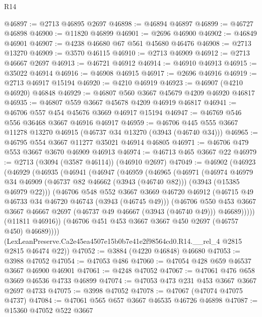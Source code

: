\begin{lexlean}{R14}
\begin{coremodule}
@46897 := @2713 @46895 @2697
@46898 := @46894 @46897
@46899 := @46727 @46898
@46900 := @11820 @46899
@46901 := @2696 @46900
@46902 := @46849 @46901
@46907 := @4238 @46680 @67 @561 @45680 @46476
@46908 := @2713 @13270
@46909 := @3570 @46115
@46910 := @2713 @46909
@46912 := @2713 @46667 @2697
@46913 := @46721 @46912
@46914 := @46910 @46913
@46915 := @35022 @46914
@46916 := @46908 @46915
@46917 := @2696 @46916
@46919 := @2713 @46917 @15194
@46920 := @4210 @46919
@46923 := @46907 (@4210 @46920) @46848
@46929 := @46807 @560 @3667 @45679 @4209 @46920 @46817
@46935 := @46807 @559 @3667 @45678 @4209 @46919 @46817
@46941 := @46706 @557 @454 @45676 @3669 @46917 @15194
@46947 := @46769 @546 @556 @36468 @3667 @46916 @46917
@46959 := @46706 @445 @555 @3667 @11278 @13270 @46915 (@46737 @34 @13270 (@3943 (@46740 @34)))
@46965 := @46795 @554 @3667 @11277 @35021 @46914 @46805
@46971 := @46706 @479 @553 @3667 @3670 @46909 @46913
@46974 := @46713 @465 @3667 @22
@46979 := @2713 (@3094 (@3587 @46114)) (@46910 @2697)
@47049 := @46902
    (@46923
      (@46929
        (@46935
          (@46941
            (@46947
              (@46959
                (@46965
                  (@46971
                    (@46974
                      @46979
                      @34
                      @46909
                      (@46737 @82 @46662 (@3943 (@46740 @82)))
                      (@3943 (@15385 @46979 @22)))
                    (@46706
                      @548
                      @552
                      @3667
                      @3669
                      @46720
                      @46912
                      (@46715 @49 @46733 @34 @46720 @46743 (@3943 (@46745 @49)))
                      (@46706
                        @550
                        @453
                        @3667
                        @3667
                        @46667
                        @2697
                        (@46737 @49 @46667 (@3943 (@46740 @49)))
                        @46689)))))
              (@11811 @46916))
            (@46706 @451 @453 @3667 @3667 @450 @2697 (@46757 @450) @46689))))
      (LexLeanPreserve.Ca2e45ea4507e15b0b7e41e2f98564cd0.R14.__rel_4 @2815 @2815 @46474 @22))
@47052 := @3884 (@4220 @46848) @46680
@47053 := @3988 @47052
@47054 := @47053 @486
@47060 := @47054 @428 @659 @46537 @3667 @46900 @46901
@47061 := @4248 @47052
@47067 := @47061 @476 @658 @3669 @46536 @4733 @46899
@47074 := @47053 @473 @231 @453 @3667 @3667 @2697 @4733
@47075 := @3998 @47052
@47078 := @47067 (@47074 @47075 @4737)
@47084 := @47061 @565 @657 @3667 @46535 @46726 @46898
@47087 := @15360 @47052 @522 @3667

\end{coremodule}
\end{lexlean}
